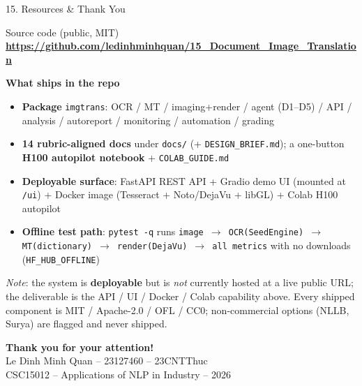 \documentclass[10pt,aspectratio=169]{beamer}
\begin{document}
\begin{frame}{15. Resources \& Thank You}
\begin{block}{Source code (public, MIT)}
\centering
\large \textbf{\url{https://github.com/ledinhminhquan/15_Document_Image_Translation}}
\end{block}

\textbf{What ships in the repo}
\begin{itemize}\scriptsize
  \item \textbf{Package} \texttt{imgtrans}: OCR / MT / imaging+render / agent (D1--D5) / API / analysis / autoreport / monitoring / automation / grading
  \item \textbf{14 rubric-aligned docs} under \texttt{docs/} (+ \texttt{DESIGN\_BRIEF.md}); a one-button \textbf{H100 autopilot notebook} + \texttt{COLAB\_GUIDE.md}
  \item \textbf{Deployable surface}: FastAPI REST API + Gradio demo UI (mounted at \texttt{/ui}) + Docker image (Tesseract + Noto/DejaVu + libGL) + Colab H100 autopilot
  \item \textbf{Offline test path}: \texttt{pytest -q} runs \texttt{image $\rightarrow$ OCR(SeedEngine) $\rightarrow$ MT(dictionary) $\rightarrow$ render(DejaVu) $\rightarrow$ all metrics} with no downloads (\texttt{HF\_HUB\_OFFLINE})
\end{itemize}

\scriptsize \emph{Note}: the system is \textbf{deployable} but is \emph{not} currently hosted at a live public URL; the deliverable is the API / UI / Docker / Colab capability above. Every shipped component is MIT / Apache-2.0 / OFL / CC0; non-commercial options (NLLB, Surya) are flagged and never shipped.

\vspace{0.25cm}
\centering
\Large\textbf{Thank you for your attention!}\\[0.2cm]
\normalsize Le Dinh Minh Quan -- 23127460 -- 23CNTThuc \\
\small CSC15012 -- Applications of NLP in Industry -- 2026
\end{frame}
\end{document}
